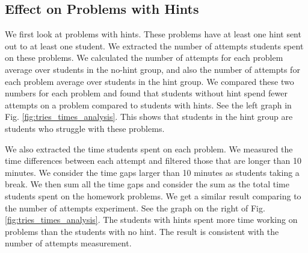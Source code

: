 \documentclass{llncs}
\begin{document}
\subsection{Effect on Problems with Hints}
We first look at problems with hints. These problems have at least one hint sent out to at least one student. We extracted the number of attempts students spent on these problems. We calculated the number of attempts for each problem average over students in the no-hint group, and also the number of attempts for each problem average over students in the hint group. We compared these two numbers for each problem and found that students without hint spend fewer attempts on a problem compared to students with hints. See the left graph in Fig. \ref{fig:tries_times_analysis}. This shows that students in the hint group are students who struggle with these problems.

We also extracted the time students spent on each problem. We measured the time differences between each attempt and filtered those that are longer than 10 minutes. We consider the time gaps larger than 10 minutes as students taking a break. We then sum all the time gaps and consider the sum as the total time students spent on the homework problems. We get a similar result comparing to the number of attempts experiment. See the graph on the right of Fig. \ref{fig:tries_times_analysis}. The students with hints spent more time working on problems than the students with no hint. The result is consistent with the number of attempts measurement.
\end{document}
